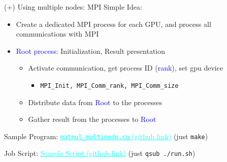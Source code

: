 \documentclass[dvipdfmx, 11pt, aspectratio=169]{beamer}   %
\newcommand{\ulhref}[2]{\href{#1}{\textcolor{cyan}{\uline{#2}}}}
\begin{document}
\begin{frame}[fragile]{(+) Using multiple nodes: MPI}
  Simple Idea:
  \begin{itemize}
    \item Create a dedicated MPI process for each GPU, and process all communications with MPI
    \item \textcolor{blue}{Root process}: Initialization, Result presentation
    \begin{itemize}
      \item Activate communication, get process ID (\textcolor{blue}{rank}), set gpu device
      \begin{itemize}
        \item \lstinline|MPI_Init, MPI_Comm_rank, MPI_Comm_size|
      \end{itemize}
      \item Distribute data from \textcolor{blue}{Root} to the processes
      \item Gather result from the processes to \textcolor{blue}{Root}
    \end{itemize}
  \end{itemize}
  Sample Program: 
  \ulhref{https://github.com/gunnersgoestocl/cuda-introduction/blob/main/multinode/matmul_multinode.cu}{\lstinline|matmul_multinode.cu| (github link)} (just \lstinline|make|) 

  Job Script:
  \ulhref{https://github.com/gunnersgoestocl/cuda-introduction/blob/main/multinode/run.sh}{Sample Script (github link)} (just \lstinline|qsub ./run.sh|)
\end{frame}
\end{document}
